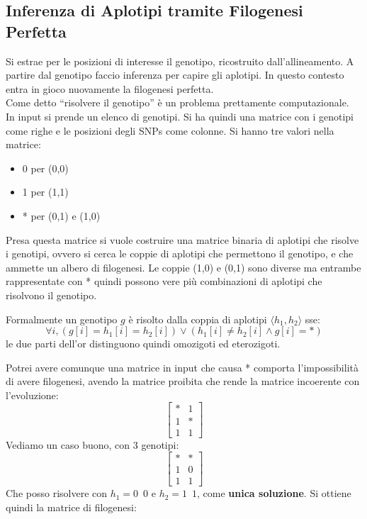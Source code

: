 \documentclass[a4paper,12pt, oneside]{book}
\begin{document}
\subsection{Inferenza di Aplotipi tramite Filogenesi Perfetta}
Si estrae per le posizioni di interesse il genotipo, ricostruito
dall'allineamento. A partire dal genotipo faccio inferenza per capire
gli aplotipi. In questo contesto entra in gioco nuovamente la filogenesi
perfetta.\\
Come detto ``risolvere il genotipo'' è un problema prettamente computazionale.\\
In input si prende un elenco di genotipi. Si ha quindi una matrice con i
genotipi come righe e le posizioni degli SNPs come colonne. Si hanno tre valori
nella matrice:
\begin{itemize}
  \item 0 per (0,0)
  \item 1 per (1,1)
  \item * per (0,1) e (1,0)
\end{itemize}
Presa questa matrice si vuole costruire una matrice binaria di aplotipi che
risolve i genotipi, ovvero si cerca le coppie di aplotipi che permettono il
genotipo, e che ammette un albero di filogenesi. Le coppie (1,0) e (0,1) sono
diverse ma entrambe rappresentate con * quindi possono vere più combinazioni di
aplotipi che risolvono il genotipo.
\begin{definizione}
  Formalmente un genotipo $g$ è risolto dalla coppia di aplotipi $\langle
  h_1,h_2\rangle$ sse:
  \[\forall i, (g[i]=h_1[i]=h_2[i])\lor (h_1[i]\neq h_2[i]\land g[i]=*)\]
  le due parti dell'or distinguono quindi omozigoti ed eterozigoti.
\end{definizione}
Potrei avere comunque una matrice in input che causa * comporta l'impossibilità
di avere filogenesi, avendo la matrice proibita che rende la matrice incoerente
con l'evoluzione:
\[\left[
  \begin{matrix}
    * & 1\\
    1 & *\\
    1 & 1
  \end{matrix}\right]
\]
Vediamo un caso buono, con 3 genotipi:
\[\left[
  \begin{matrix}
    * & *\\
    1 & 0\\
    1 & 1
  \end{matrix}\right]
\]
Che posso risolvere con $h_1=0\,\,\,0$ e $h_2=1\,\,\,1$, come \textbf{unica
soluzione}. Si ottiene quindi la matrice di filogenesi:
\end{document}
